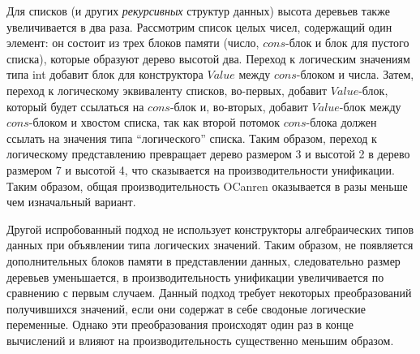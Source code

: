 \documentclass[10pt]{article}
\begin{document}
Для списков (и других \emph{рекурсивных} структур данных) высота деревьев также увеличивается в два раза. Рассмотрим
список целых чисел, содержащий один элемент: он состоит из трех блоков памяти (число, $cons$-блок и блок для пустого списка),
которые образуют дерево высотой два. Переход к логическим значениям типа int добавит блок для конструктора $Value$
между $cons$-блоком и числа. Затем, переход к логическому эквиваленту списков, во-первых, добавит $Value$-блок, который будет
ссылаться на $cons$-блок и, во-вторых, добавит $Value$-блок между $cons$-блоком и хвостом списка, так как второй потомок
$cons$-блока должен ссылать на значения типа ``логического'' списка. Таким образом, переход к логическому представлению
превращает дерево размером 3 и высотой 2 в дерево размером 7 и высотой 4, что сказывается на производительности унификации.
Таким образом, общая производительность OCanren оказывается в разы меньше чем изначальный вариант.

Другой испробованный подход не использует конструкторы алгебраических типов данных при объявлении типа логических значений.
Таким образом, не появляется дополнительных блоков памяти в представлении данных, следовательно размер деревьев уменьшается,
в производительность унификации увеличивается по сравнению с первым случаем. Данный подход требует некоторых
преобразований получившихся значений, если они содержат в себе сводоные логические переменные. Однако эти преобразования
происходят один раз в конце вычислений и влияют на производительность существенно меньшим образом.




\end{document}
